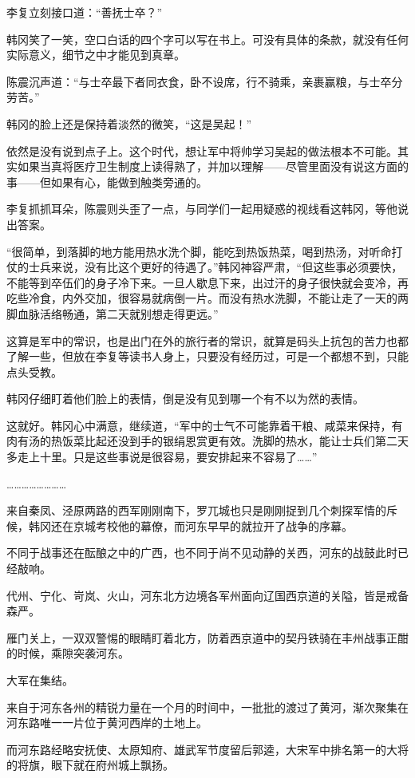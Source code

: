 李复立刻接口道：“善抚士卒？”

韩冈笑了一笑，空口白话的四个字可以写在书上。可没有具体的条款，就没有任何实际意义，细节之中才能见到真章。

陈震沉声道：“与士卒最下者同衣食，卧不设席，行不骑乘，亲裹赢粮，与士卒分劳苦。”

韩冈的脸上还是保持着淡然的微笑，“这是吴起！”

依然是没有说到点子上。这个时代，想让军中将帅学习吴起的做法根本不可能。其实如果当真将医疗卫生制度上读得熟了，并加以理解——尽管里面没有说这方面的事——但如果有心，能做到触类旁通的。

李复抓抓耳朵，陈震则头歪了一点，与同学们一起用疑惑的视线看这韩冈，等他说出答案。

“很简单，到落脚的地方能用热水洗个脚，能吃到热饭热菜，喝到热汤，对听命打仗的士兵来说，没有比这个更好的待遇了。”韩冈神容严肃，“但这些事必须要快，不能等到卒伍们的身子冷下来。一旦人歇息下来，出过汗的身子很快就会变冷，再吃些冷食，内外交加，很容易就病倒一片。而没有热水洗脚，不能让走了一天的两脚血脉活络畅通，第二天就别想走得更远。”

这算是军中的常识，也是出门在外的旅行者的常识，就算是码头上抗包的苦力也都了解一些，但放在李复等读书人身上，只要没有经历过，可是一个都想不到，只能点头受教。

韩冈仔细盯着他们脸上的表情，倒是没有见到哪一个有不以为然的表情。

这就好。韩冈心中满意，继续道，“军中的士气不可能靠着干粮、咸菜来保持，有肉有汤的热饭菜比起还没到手的银绢恩赏更有效。洗脚的热水，能让士兵们第二天多走上十里。只是这些事说是很容易，要安排起来不容易了……”

……………………

来自秦凤、泾原两路的西军刚刚南下，罗兀城也只是刚刚捉到几个刺探军情的斥候，韩冈还在京城考校他的幕僚，而河东早早的就拉开了战争的序幕。

不同于战事还在酝酿之中的广西，也不同于尚不见动静的关西，河东的战鼓此时已经敲响。

代州、宁化、岢岚、火山，河东北方边境各军州面向辽国西京道的关隘，皆是戒备森严。

雁门关上，一双双警惕的眼睛盯着北方，防着西京道中的契丹铁骑在丰州战事正酣的时候，乘隙突袭河东。

大军在集结。

来自于河东各州的精锐力量在一个月的时间中，一批批的渡过了黄河，渐次聚集在河东路唯一一片位于黄河西岸的土地上。

而河东路经略安抚使、太原知府、雄武军节度留后郭逵，大宋军中排名第一的大将的将旗，眼下就在府州城上飘扬。

